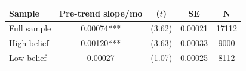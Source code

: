 \begin{tabular}{lcccc}
\toprule
Sample & Pre-trend slope/mo & ($t$) & SE & N \\
\midrule
Full sample & 0.00074*** & (3.62) & 0.00021 & 17112 \\
High belief & 0.00120*** & (3.63) & 0.00033 & 9000 \\
Low belief & 0.00027 & (1.07) & 0.00025 & 8112 \\
\bottomrule
\end{tabular}
